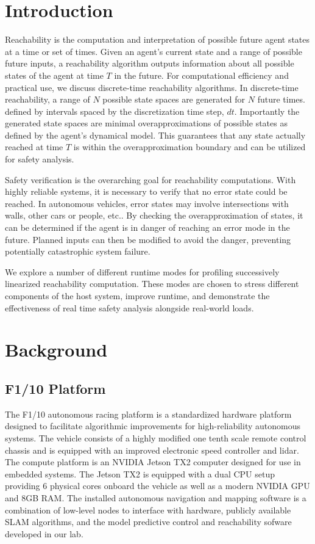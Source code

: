 \documentclass[runningheads]{llncs}
\begin{document}
\section{Introduction}
Reachability is the computation and interpretation of possible future agent states at a time or set of times. Given an agent's current state and a range of possible future inputs, a reachability algorithm outputs information about all possible states of the agent at time $T$ in the future. For computational efficiency and practical use, we discuss discrete-time reachability algorithms. In discrete-time reachability, a range of $N$ possible state spaces are generated for $N$ future times. defined by intervals spaced by the discretization time step, $dt$. Importantly the generated state spaces are minimal overapproximations of possible states as defined by the agent’s dynamical model. This guarantees that any state actually reached at time $T$ is within the overapproximation boundary and can be utilized for safety analysis.

Safety verification is the overarching goal for reachability computations. With highly reliable systems, it is necessary to verify that no error state could be reached. In autonomous vehicles, error states may involve intersections with walls, other cars or people, etc.. By checking the overapproximation of states, it can be determined if the agent is in danger of reaching an error mode in the future. Planned inputs can then be modified to avoid the danger, preventing potentially catastrophic system failure.

We explore a number of different runtime modes for profiling successively linearized reachability computation. These modes are chosen to stress different components of the host system, improve runtime, and demonstrate the effectiveness of real time safety analysis alongside real-world loads.

\section{Background}
\subsection{F1/10 Platform}
The F1/10 autonomous racing platform is a standardized hardware platform designed to facilitate algorithmic improvements for high-reliability autonomous systems. The vehicle consists of a highly modified one tenth scale remote control chassis and is equipped with an improved electronic speed controller and lidar. The compute platform is an NVIDIA Jetson TX2 computer designed for use in embedded systems. The Jetson TX2 is equipped with a dual CPU setup providing 6 physical cores onboard the vehicle as well as a modern NVIDIA GPU and 8GB RAM. The installed autonomous navigation and mapping software is a combination of low-level nodes to interface with hardware, publicly available SLAM algorithms, and the model predictive control and reachability sofware developed in our lab.
\end{document}
